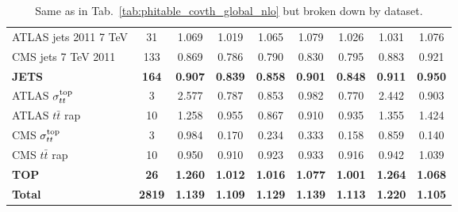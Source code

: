 \begin{table}[H]
\begin{center}
{\begin{tabular}{|l|c|c|ccc|cc|c|}
\midrule
ATLAS jets 2011 7 TeV                   &   31 & 1.069 & 1.019 & 1.065 & 1.079 & 1.026 & 1.031 & 1.076 \\
CMS jets 7 TeV 2011                     &  133 & 0.869 & 0.786 & 0.790 & 0.830 & 0.795 & 0.883 & 0.921 \\
\midrule
\bf JETS                                &  \bf 164 & \bf 0.907 & \bf 0.839 & \bf 0.858 & \bf 0.901 & \bf 0.848 & \bf 0.911 & \bf 0.950 \\
\midrule
ATLAS $\sigma_{tt}^{\rm top}$              &    3 & 2.577 & 0.787 & 0.853 & 0.982 & 0.770 & 2.442 & 0.903 \\
ATLAS $t\bar{t}$ rap                    &   10 & 1.258 & 0.955 & 0.867 & 0.910 & 0.935 & 1.355 & 1.424 \\
CMS $\sigma_{tt}^{\rm top}$                &    3 & 0.984 & 0.170 & 0.234 & 0.333 & 0.158 & 0.859 & 0.140 \\
CMS $t\bar{t}$ rap                      &   10 & 0.950 & 0.910 & 0.923 & 0.933 & 0.916 & 0.942 & 1.039 \\ 
\midrule
\bf TOP                                 &  \bf  26 & \bf 1.260 & \bf 1.012 & \bf 1.016 & \bf 1.077 & \bf 1.001 & \bf 1.264 & \bf 1.068 \\ 
\midrule
\bf Total                               & \bf 2819 & \bf 1.139 & \bf 1.109 & \bf 1.129 & \bf 1.139 & \bf 1.113 & \bf 1.220 & \bf 1.105 \\
\bottomrule
\end{tabular}}
\end{center}
\caption{Same as in Tab.~\ref{tab:phitable_covth_global_nlo} but broken down by dataset.
  \label{table:chi2table_covth_global_nlo}
}
  \end{table}
